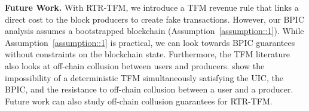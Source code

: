 \documentclass[sigconf,anonymous]{aamas}
\newcommand{\ourTFM}{\textsc{RTR-TFM}}
\renewcommand{\paragraph}[1]{\smallskip\noindent\textbf{#1}}
\begin{document}
\paragraph{Future Work.} With \ourTFM, we introduce a TFM revenue rule that links a direct cost to the block producers to create fake transactions. However, our BPIC analysis assumes a bootstrapped blockchain (Assumption~\ref{assumption::1}). While Assumption~\ref{assumption::1} is practical, we can look towards BPIC guarantees without constraints on the blockchain state. Furthermore, the TFM literature also looks at off-chain collusion between users and producers. \cite{gafni2024barriers} show the impossibility of a deterministic TFM simultaneously satisfying the UIC, the BPIC, and the resistance to off-chain collusion between a user and a producer. Future work can also study off-chain collusion guarantees for \ourTFM. 




\cleardoublepage
 


\end{document}
